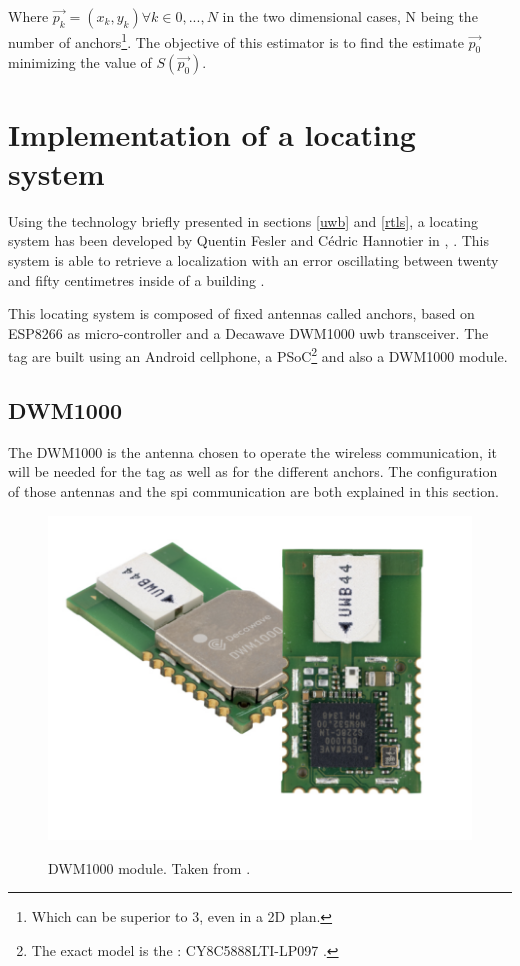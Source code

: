 Where $\vec{p_k} = (x_k, y_k) \forall k\in {0, ... , N}$ in the two dimensional cases, N being the number of anchors\footnote{Which can be superior to 3, even in a 2D plan.}. The objective of this estimator is to find the estimate $\vec{p_0}$ minimizing the value of $S(\vec{p_0})$.

\section{Implementation of a locating system}
\label{loc_syst}

Using the technology briefly presented in sections \ref{uwb} and \ref{rtls}, a locating system has been developed by Quentin Fesler and Cédric Hannotier in  \cite{fesler2018high}, \cite{hannotier2019indoor}. This system is able to retrieve a localization with an error oscillating between twenty and fifty centimetres inside of a building \cite{guyard2019navigation}.
\vspace{2mm}

This locating system is composed of fixed antennas called anchors, based on ESP8266 as micro-controller and a Decawave DWM1000 \gls{uwb} transceiver\cite{decawave}. The tag are built using an Android cellphone, a PSoC\footnote{The exact model is the : CY8C5888LTI-LP097 \cite{guyard2019navigation}.} and also a DWM1000 module.

\subsection{DWM1000}
\label{dwm1000}

The DWM1000 is the antenna chosen to operate the wireless communication, it will be needed for the tag as well as for the different anchors. The configuration of those antennas and the \gls{spi} communication are both explained in this section.

\begin{figure}[H]
	\centering
	\includegraphics[width=.3\linewidth]{Images/DWM1000.png}
	\label{fig:dwm1000}
	\caption{DWM1000 module. Taken from \cite{decawave}.}
\end{figure}

